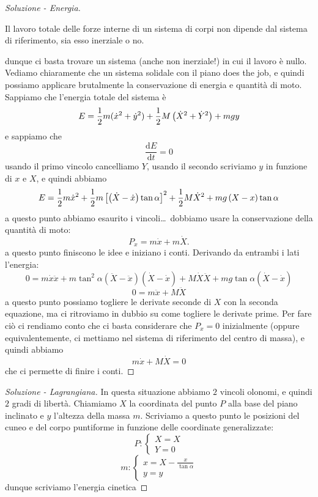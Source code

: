 \documentclass[11pt]{scrartcl}
\newcommand{\dif}{\text{d}}
\begin{document}
\begin{sol}
\begin{proof}[Soluzione - Energia]
			\begin{theorem}
				Il lavoro totale delle forze interne di un sistema di corpi non dipende dal sistema di riferimento, sia esso inerziale o no.
			\end{theorem}
			dunque ci basta trovare un sistema (anche non inerziale!) in cui il lavoro è nullo. Vediamo chiaramente che un sistema solidale con il piano does the job, e quindi possiamo applicare brutalmente la conservazione di energia e quantità di moto. Sappiamo che l'energia totale del sistema è
			$$E=\frac{1}{2} m(\dot{x}^2+\dot{y}^2)+\frac{1}{2} M\left(\dot{X}^2+\dot{Y}^2\right)+mgy$$
			e sappiamo che
			$$\frac{\dif E}{\dif t}=0$$
			usando il primo vincolo cancelliamo $Y$, usando il secondo scriviamo $y$ in funzione di $x$ e $X$, e quindi abbiamo
			$$E=\frac{1}{2} m\dot{x}^2+\frac{1}{2} m\left[\left(\dot{X}-\dot{x}\right)\tan\alpha\right]^2+\frac{1}{2} M\dot{X}^2+mg\left(X-x\right)\tan \alpha$$
			a questo punto abbiamo esaurito i vincoli\dots\, dobbiamo usare la conservazione della quantità di moto:
			$$P_x=m\dot{x}+m\dot{X}.$$
			a questo punto finiscono le idee e iniziano i conti. Derivando da entrambi i lati l'energia:
			$$0=m\dot{x}\ddot{x}+m\tan^2\alpha\left(\ddot{X}-\ddot{x}\right)\left(\dot{X}-\dot{x}\right)+M\dot{X}\ddot{X}+mg\tan\alpha\left(\dot X -\dot{x}\right)$$
			$$0=m\ddot{x}+M\ddot{X}$$
			a questo punto possiamo togliere le derivate seconde di $X$ con la seconda equazione, ma ci ritroviamo in dubbio su come togliere le derivate prime. Per fare ciò ci rendiamo conto che ci basta considerare che $P_x=0$ inizialmente (oppure equivalentemente, ci mettiamo nel sistema di riferimento del centro di massa), e quindi abbiamo
			$$m\dot{x}+M\dot{X}=0$$
			che ci permette di finire i conti.
		\end{proof}
		\begin{proof}[Soluzione - Lagrangiana]
			In questa situazione abbiamo $2$ vincoli olonomi, e quindi $2$ gradi di libertà. Chiamiamo $X$ la coordinata del punto $P$ alla base del piano inclinato e $y$ l'altezza della massa $m$. Scriviamo a questo punto le posizioni del cuneo e del corpo puntiforme in funzione delle coordinate generalizzate:
			$$P:
			\begin{cases}
				X=X \\
				Y=0
			\end{cases}
			$$
			$$m:
			\begin{cases}
				x=X-\frac{x}{\tan \alpha} \\
				y=y
			\end{cases}
			$$
			dunque scriviamo l'energia cinetica

\end{proof}
\end{sol}
\end{document}
